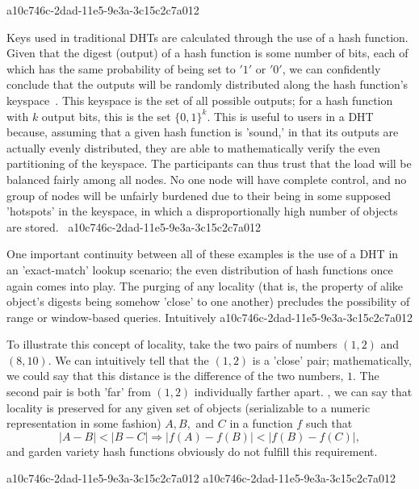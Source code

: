\documentclass[12pt]{article}
\begin{document}
a10c746c-2dad-11e5-9e3a-3c15c2c7a012\par Keys used in traditional DHTs are calculated through the use of a hash function. Given that the digest (output) of a hash function is some number of bits, each of which has the same probability of being set to $'1'$ or $'0'$, we can confidently conclude that the outputs will be randomly distributed along the hash function's keyspace~. This keyspace is the set of all possible outputs; for a hash function with $k$ output bits, this is the set $\{0,1\}^k$. This is useful to users in a DHT because, assuming that a given hash function is 'sound,' in that its outputs are actually evenly distributed, they are able to mathematically verify the even partitioning of the keyspace. The participants can thus trust that the load will be balanced fairly among all nodes. No one node will have complete control, and no group of nodes will be unfairly burdened due to their being in some supposed 'hotspots' in the keyspace, in which a disproportionally high number of objects are stored.~
a10c746c-2dad-11e5-9e3a-3c15c2c7a012
\par One important continuity between all of these examples is the use of a DHT in an 'exact-match' lookup scenario; the even distribution of hash functions once again comes into play. The purging of any locality (that is, the property of alike object's digests being somehow 'close' to one another) precludes the possibility of range or window-based queries. Intuitively
a10c746c-2dad-11e5-9e3a-3c15c2c7a012
\par To illustrate this concept of locality, take the two pairs of numbers $(1,2)$ and $(8,10)$. We can intuitively tell that the $(1,2)$ is a 'close' pair; mathematically, we could say that this distance is the difference of the two numbers, $1$. The second pair is both 'far' from $(1,2)$ individually farther apart. , we can say that locality is preserved for any given set of objects (serializable to a numeric representation in some fashion) $A,B,$ and $C$ in a function $f$ such that
\begin{equation}
|A-B| < |B-C| \Rightarrow |f(A)-f(B)| < |f(B) - f(C)|,
\end{equation}
and garden variety hash functions obviously do not fulfill this requirement.

a10c746c-2dad-11e5-9e3a-3c15c2c7a012\printbibliography
a10c746c-2dad-11e5-9e3a-3c15c2c7a012
\end{document}
